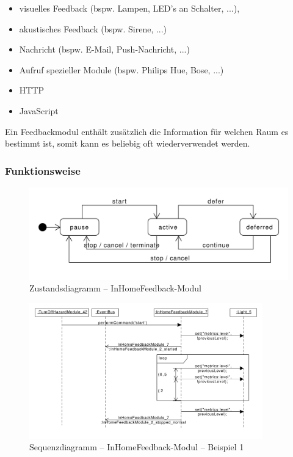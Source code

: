 \begin{itemize}
	\item visuelles Feedback (bspw. Lampen, LED’s an Schalter, ...),
	\item akustisches Feedback (bspw. Sirene, ...)
	\item Nachricht (bspw. E-Mail, Push-Nachricht, ...)
	\item Aufruf spezieller Module (bspw. Philips Hue, Bose, ...)
	\item HTTP
	\item JavaScript
\end{itemize}
Ein Feedbackmodul enthält zusätzlich die Information für welchen Raum es bestimmt ist, somit kann es beliebig oft wiederverwendet werden.

\subsubsection{Funktionsweise}

\begin{figure}[h!]
	\centering
	\includegraphics[scale=0.7]{img/Modulkonzeption/FeedbackStateMachine.pdf}
	\caption{Zustandsdiagramm – InHomeFeedback-Modul}
	\label{fig:feedbackStateMachine}
\end{figure}

\begin{figure}[h!]
	\centering
	\includegraphics[width=0.9\textwidth]{img/Modulkonzeption/FeedbackSequence.pdf}
	\caption{Sequenzdiagramm – InHomeFeedback-Modul – Beispiel 1}
	\label{fig:feedbackSequence}
\end{figure}

